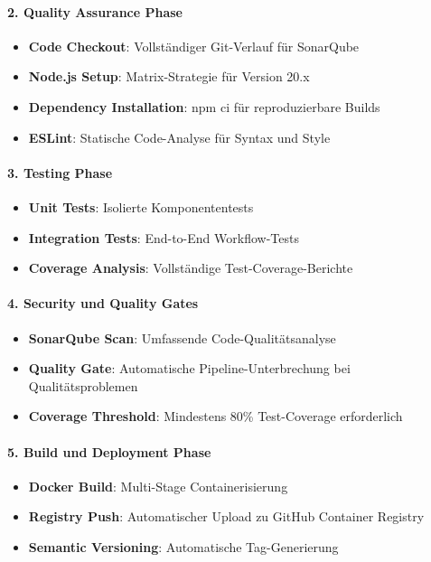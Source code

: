 \paragraph{2. Quality Assurance Phase}
\begin{itemize}
    \item \textbf{Code Checkout}: Vollständiger Git-Verlauf für SonarQube
    \item \textbf{Node.js Setup}: Matrix-Strategie für Version 20.x
    \item \textbf{Dependency Installation}: npm ci für reproduzierbare Builds
    \item \textbf{ESLint}: Statische Code-Analyse für Syntax und Style
\end{itemize}

\paragraph{3. Testing Phase}
\begin{itemize}
    \item \textbf{Unit Tests}: Isolierte Komponententests
    \item \textbf{Integration Tests}: End-to-End Workflow-Tests
    \item \textbf{Coverage Analysis}: Vollständige Test-Coverage-Berichte
\end{itemize}

\paragraph{4. Security und Quality Gates}
\begin{itemize}
    \item \textbf{SonarQube Scan}: Umfassende Code-Qualitätsanalyse
    \item \textbf{Quality Gate}: Automatische Pipeline-Unterbrechung bei Qualitätsproblemen
    \item \textbf{Coverage Threshold}: Mindestens 80\% Test-Coverage erforderlich
\end{itemize}

\paragraph{5. Build und Deployment Phase}
\begin{itemize}
    \item \textbf{Docker Build}: Multi-Stage Containerisierung
    \item \textbf{Registry Push}: Automatischer Upload zu GitHub Container Registry
    \item \textbf{Semantic Versioning}: Automatische Tag-Generierung
\end{itemize}

